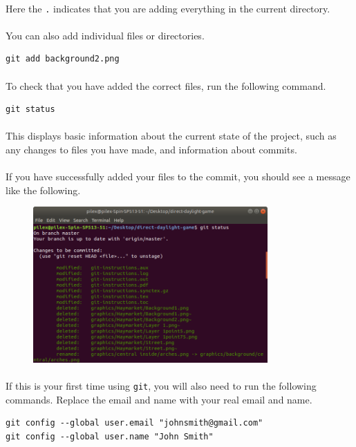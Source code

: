 \documentclass[11pt]{article}
\begin{document}
\paragraph{}
Here the \lstinline{.} indicates that you are adding everything in the current directory.
\paragraph{}
You can also add individual files or directories.
\begin{lstlisting}
git add background2.png
\end{lstlisting}
\paragraph{}
To check that you have added the correct files, run the following command.
\begin{lstlisting}
git status
\end{lstlisting}
\paragraph{}
This displays basic information about the current state of the project, such as any changes to files you have made, and information about commits.
\paragraph{}
If you have successfully added your files to the commit, you should see a message like the following.
\begin{figure}[H]
\centering
\includegraphics[scale=1.0, width=0.8\textwidth]{latex-images/git1}
\caption{}
\end{figure}
\paragraph{}
If this is your first time using \lstinline{git}, you will also need to run the following commands. Replace the email and name with your real email and name.
\begin{lstlisting}
git config --global user.email "johnsmith@gmail.com"
git config --global user.name "John Smith"
\end{lstlisting}
\end{document}
